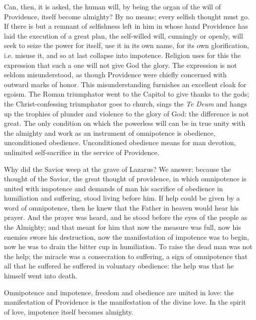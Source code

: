 \documentclass[12pt,a4paper,openany]{book}
\newcommand{\opage}[1]{\marginnote{\footnotesize\textit{[#1]}}}
\begin{document}
Can, then, it is asked, the human will, by being the organ of the will of Providence, itself become almighty? By no
means; every selfish thought must go. If there is but a remnant of selfishness left in him in whose hand Providence has
laid the execution of a great plan, the self-willed will, cunningly or openly, will seek to seize the power for itself,
use it in its own name, for its own glorification, i.e. misuse it, and so at last collapse into impotence. Religion
uses for this the expression that such a one will not give God the glory. The expression is not seldom misunderstood,
as though Providence were chiefly concerned with outward marks of honor. This misunderstanding furnishes an excellent
cloak for egoism. The Roman triumphator went to the Capitol to give thanks to the gods;
\setcounter{footnote}{0}%
\opage{67}the Christ-confessing triumphator goes to church, sings the \textit{Te Deum} and hangs up the trophies of
plunder and violence to the glory of God: the difference is not great. The only condition on which the powerless will
can be in true unity with the almighty and work as an instrument of omnipotence is obedience, unconditioned obedience.
Unconditioned obedience means for man devotion, unlimited self-sacrifice in the service of Providence.

Why did the Savior weep at the grave of Lazarus? We answer: because the thought of the Savior, the great thought of
providence, in which omnipotence is united with impotence and demands of man his sacrifice of obedience in humiliation
and suffering, stood living before him. If help could be given by a word of omnipotence, then he knew that the Father
in heaven would hear his prayer. And the prayer was heard, and he stood before the eyes of the people as the Almighty;
and that meant for him that now the measure was full, now his enemies swore his destruction, now the manifestation of
impotence was to begin, now he was to drain the bitter cup in humiliation. To raise the dead man was not the help; the
miracle was a consecration to suffering, a sign of omnipotence that all that he suffered he suffered in voluntary
obedience: the help was that he himself went into death.

Omnipotence and impotence, freedom and obedience are united in love: the manifestation of Providence is the %
manifestation of the divine love. In the spirit of love, impotence itself becomes almighty.
\end{document}
